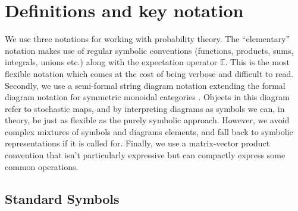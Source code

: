 
\section{Definitions and key notation}\label{sec:dfin}

We use three notations for working with probability theory. The ``elementary'' notation makes use of regular symbolic conventions (functions, products, sums, integrals, unions etc.) along with the expectation operator $\mathbb{E}$. This is the most flexible notation which comes at the cost of being verbose and difficult to read. Secondly, we use a semi-formal string diagram notation extending the formal diagram notation for symmetric monoidal categories \cite{selinger_survey_2010}. Objects in this diagram refer to stochastic maps, and by interpreting diagrams as symbols we can, in theory, be just as flexible as the purely symbolic approach. However, we avoid complex mixtures of symbols and diagrams elements, and fall back to symbolic representations if it is called for. Finally, we use a matrix-vector product convention that isn't particularly expressive but can compactly express some common operations.


\subsection{Standard Symbols}

